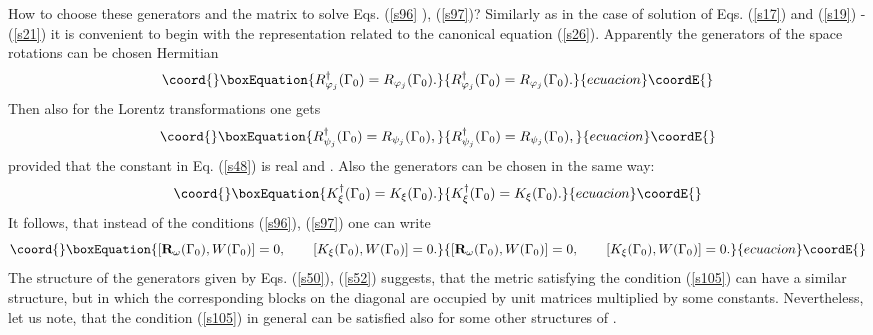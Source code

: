 \documentclass[a4paper,a4paper]{article}
\begin{document}
How to choose these generators and the matrix \coordHE{} to solve Eqs. (\ref{s96}%
), (\ref{s97})? Similarly as in the case of solution of Eqs. (\ref{s17}) and
(\ref{s19}) - (\ref{s21}) it is convenient to begin with the representation
related to the canonical equation (\ref{s26}). Apparently the generators of
the space rotations can be chosen Hermitian 
\begin{equation}\coord{}\boxEquation{
R_{\varphi _{j}}^{\dagger }(\Gamma _{0})=R_{\varphi _{j}}(\Gamma _{0}).
\label{s102}
}{
R_{\varphi _{j}}^{\dagger }(\Gamma _{0})=R_{\varphi _{j}}(\Gamma _{0}).
}{ecuacion}\coordE{}\end{equation}%
Then also for the Lorentz transformations one gets 
\begin{equation}\coord{}\boxEquation{
R_{\psi _{j}}^{\dagger }(\Gamma _{0})=R_{\psi _{j}}(\Gamma _{0}),
\label{s103}
}{
R_{\psi _{j}}^{\dagger }(\Gamma _{0})=R_{\psi _{j}}(\Gamma _{0}),
}{ecuacion}\coordE{}\end{equation}%
provided that the constant \myHighlight{$\kappa $}\coordHE{} in Eq. (\ref{s48}) is real and \coordHE{}. Also the generators \coordHE{} can be chosen in the
same way: 
\begin{equation}\coord{}\boxEquation{
K_{\xi }^{\dagger }(\Gamma _{0})=K_{\xi }(\Gamma _{0}).  \label{s104}
}{
K_{\xi }^{\dagger }(\Gamma _{0})=K_{\xi }(\Gamma _{0}).  }{ecuacion}\coordE{}\end{equation}%
It follows, that instead of the conditions (\ref{s96}), (\ref{s97}) one can
write 
\begin{equation}\coord{}\boxEquation{
\lbrack \mathbf{R}_{\omega }(\Gamma _{0}),W(\Gamma _{0})]=0,\qquad \lbrack
K_{\xi }(\Gamma _{0}),W(\Gamma _{0})]=0.  \label{s105}
}{
\lbrack \mathbf{R}_{\omega }(\Gamma _{0}),W(\Gamma _{0})]=0,\qquad \lbrack
K_{\xi }(\Gamma _{0}),W(\Gamma _{0})]=0.  }{ecuacion}\coordE{}\end{equation}%
The structure of the generators \coordHE{} given by Eqs. (\ref{s50}), (\ref{s52}) suggests, that the
metric \coordHE{} satisfying the condition (\ref{s105}) can have a similar
structure, but in which the corresponding blocks on the diagonal are
occupied by unit matrices multiplied by some constants. Nevertheless, let us
note, that the condition (\ref{s105}) in general can be satisfied also for
some other structures of \coordHE{}.
\end{document}
